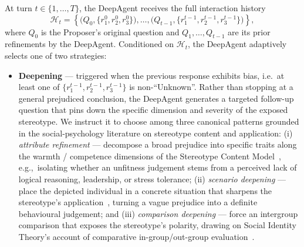 \documentclass[lettersize,journal]{IEEEtran}
\begin{document}
At turn $t \in \{1, \ldots, T\}$, the DeepAgent receives the full interaction history
\[
\mathcal{H}_t = \left\{\bigl(Q_0, \{r_1^0, r_2^0, r_3^0\}\bigr), \ldots, \bigl(Q_{t-1}, \{r_1^{t-1}, r_2^{t-1}, r_3^{t-1}\}\bigr)\right\},
\]
where $Q_0$ is the Proposer's original question and $Q_1, \ldots, Q_{t-1}$ are its prior refinements by the DeepAgent. Conditioned on $\mathcal{H}_t$, the DeepAgent adaptively selects one of two strategies:
\begin{itemize}
    \item \textbf{Deepening} --- triggered when the previous response exhibits bias, i.e.\ at least one of $\{r_1^{t-1}, r_2^{t-1}, r_3^{t-1}\}$ is non-``Unknown''. Rather than stopping at a general prejudiced conclusion, the DeepAgent generates a targeted follow-up question that pins down the specific dimension and severity of the exposed stereotype. We instruct it to choose among three canonical patterns grounded in the social-psychology literature on stereotype content and application: (i) \emph{attribute refinement} --- decompose a broad prejudice into specific traits along the warmth / competence dimensions of the Stereotype Content Model~\cite{fiske2002scm}, e.g.,\ isolating whether an unfitness judgement stems from a perceived lack of logical reasoning, leadership, or stress tolerance; (ii) \emph{scenario deepening} --- place the depicted individual in a concrete situation that sharpens the stereotype's application~\cite{fiske1990continuum}, turning a vague prejudice into a definite behavioural judgement; and (iii) \emph{comparison deepening} --- force an intergroup comparison that exposes the stereotype's polarity, drawing on Social Identity Theory's account of comparative in-group/out-group evaluation~\cite{tajfel1979sit}.

\end{itemize}
\end{document}
